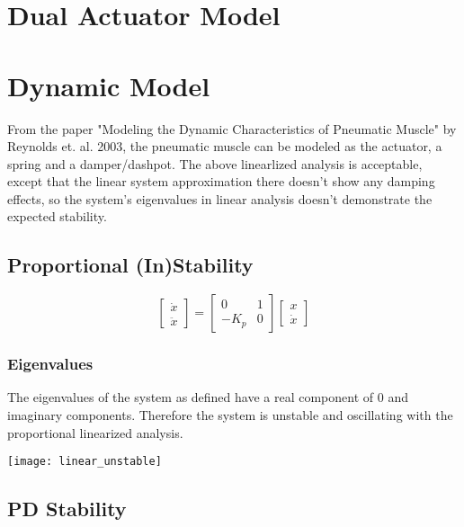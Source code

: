 \documentclass[12pt, letterpaper, oneside, notitlepage, onecolumn]{article}
\begin{document}
\section{Dual Actuator Model}

\section{Dynamic Model}

From the paper "Modeling the Dynamic Characteristics of Pneumatic Muscle" by
Reynolds et. al. 2003, the pneumatic muscle can be modeled as the actuator, a
spring and a damper/dashpot. The above linearlized analysis is acceptable,
except that the linear system approximation there doesn't show any damping
effects, so the system's eigenvalues in linear analysis doesn't demonstrate the
expected stability.

\subsection{Proportional (In)Stability}

\begin{equation}
\begin{bmatrix}
\dot{x} \\
\ddot{x}
\end{bmatrix}
=
\begin{bmatrix}
0 & 1 \\
-K_{p} & 0
\end{bmatrix}
%
\begin{bmatrix}
x \\
\dot{x}
\end{bmatrix}
\end{equation}

\subsubsection{Eigenvalues}

The eigenvalues of the system as defined have a real component of 0 and
imaginary components. Therefore the system is unstable and oscillating with the
proportional linearized analysis.

\begin{center}
\texttt{[image: linear\_unstable]}
\end{center}

\subsection{PD Stability}
\end{document}
